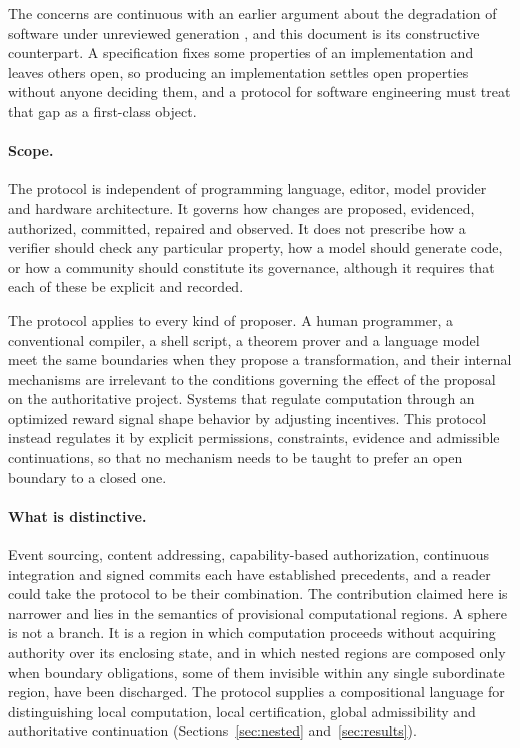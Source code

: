 \documentclass[11pt]{article}
\theoremstyle{remark}
\begin{document}
The concerns are continuous with an earlier argument about the degradation of software under unreviewed generation \cite{sdlt}, and this document is its constructive counterpart. A specification fixes some properties of an implementation and leaves others open, so producing an implementation settles open properties without anyone deciding them, and a protocol for software engineering must treat that gap as a first-class object.

\paragraph{Scope.} The protocol is independent of programming language, editor, model provider and hardware architecture. It governs how changes are proposed, evidenced, authorized, committed, repaired and observed. It does not prescribe how a verifier should check any particular property, how a model should generate code, or how a community should constitute its governance, although it requires that each of these be explicit and recorded.

The protocol applies to every kind of proposer. A human programmer, a conventional compiler, a shell script, a theorem prover and a language model meet the same boundaries when they propose a transformation, and their internal mechanisms are irrelevant to the conditions governing the effect of the proposal on the authoritative project. Systems that regulate computation through an optimized reward signal shape behavior by adjusting incentives. This protocol instead regulates it by explicit permissions, constraints, evidence and admissible continuations, so that no mechanism needs to be taught to prefer an open boundary to a closed one.

\paragraph{What is distinctive.} Event sourcing, content addressing, capability-based authorization, continuous integration and signed commits each have established precedents, and a reader could take the protocol to be their combination. The contribution claimed here is narrower and lies in the semantics of provisional computational regions. A sphere is not a branch. It is a region in which computation proceeds without acquiring authority over its enclosing state, and in which nested regions are composed only when boundary obligations, some of them invisible within any single subordinate region, have been discharged. The protocol supplies a compositional language for distinguishing local computation, local certification, global admissibility and authoritative continuation (Sections~\ref{sec:nested} and~\ref{sec:results}).
\end{document}
